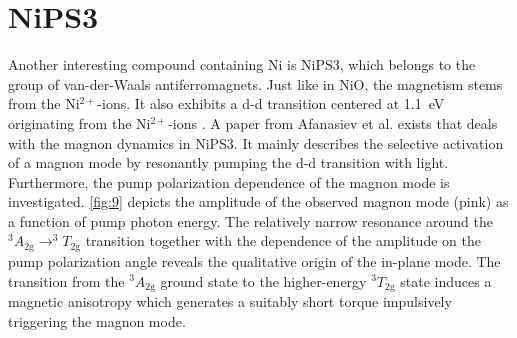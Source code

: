 \section{NiPS3}
Another interesting compound containing Ni is NiPS3, which belongs to the group of van-der-Waals antiferromagnets.
Just like in NiO, the magnetism stems from the Ni$^{2+}$-ions.
It also exhibits a d-d transition centered at \qty{1.1}{eV} originating from the Ni$^{2+}$-ions .
A paper from Afanasiev et al.  exists that deals with the magnon dynamics in NiPS3.
It mainly describes the selective activation of a magnon mode by resonantly pumping the d-d transition with light.
Furthermore, the pump polarization dependence of the magnon mode is investigated.
\autoref{fig:9} depicts the amplitude of the observed magnon mode (pink) as a function of pump photon energy.
The relatively narrow resonance around the $^3A_{2\text{g}} \rightarrow ^3T_{2\text{g}}$ transition together with the dependence of the amplitude on the pump polarization angle reveals the qualitative origin of the in-plane mode.
The transition from the $^3A_{2\text{g}}$ ground state to the higher-energy $^3T_{2\text{g}}$ state induces a magnetic anisotropy which generates a suitably short torque impulsively triggering the magnon mode.
